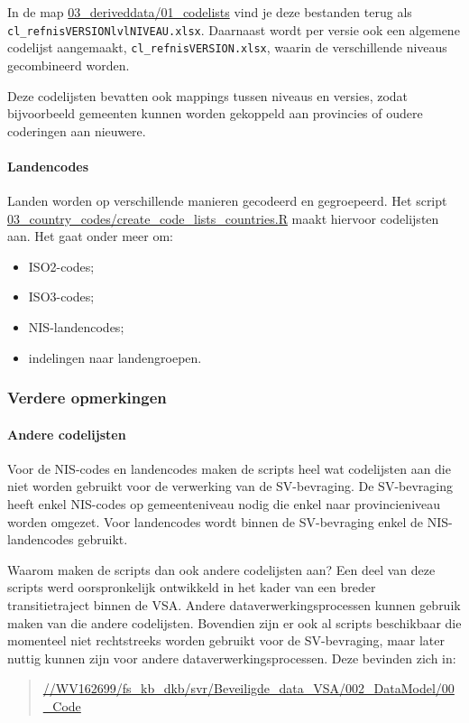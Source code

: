\documentclass{VSAnote}
\begin{document}
In de map \url{03_deriveddata/01_codelists} vind je deze bestanden terug als \verb+cl_refnisVERSIONlvlNIVEAU.xlsx+. Daarnaast wordt per versie ook een algemene codelijst aangemaakt, \verb+cl_refnisVERSION.xlsx+, waarin de verschillende niveaus gecombineerd worden.

Deze codelijsten bevatten ook mappings tussen niveaus en versies, zodat bijvoorbeeld gemeenten kunnen worden gekoppeld aan provincies of oudere coderingen aan nieuwere.

\paragraph{Landencodes}

Landen worden op verschillende manieren gecodeerd en gegroepeerd. Het script \url{03_country_codes/create_code_lists_countries.R} maakt hiervoor codelijsten aan. Het gaat onder meer om:
\begin{itemize}[nosep]
\item ISO2-codes;
\item ISO3-codes;
\item NIS-landencodes;
\item indelingen naar landengroepen.
\end{itemize}


\subsubsection{Verdere opmerkingen}

\paragraph{Andere codelijsten}

Voor de NIS-codes en landencodes maken de scripts heel wat codelijsten aan die niet worden gebruikt voor de verwerking van de SV-bevraging. De SV-bevraging heeft enkel NIS-codes op gemeenteniveau nodig die enkel naar provincieniveau worden omgezet. Voor landencodes wordt binnen de SV-bevraging enkel de NIS-landencodes gebruikt.

Waarom maken de scripts dan ook andere codelijsten aan? Een deel van deze scripts werd oorspronkelijk ontwikkeld in het kader van een breder transitietraject binnen de VSA. Andere dataverwerkingsprocessen kunnen gebruik maken van die andere codelijsten. Bovendien zijn er ook al scripts beschikbaar die momenteel niet rechtstreeks worden gebruikt voor de SV-bevraging, maar later nuttig kunnen zijn voor andere dataverwerkingsprocessen. Deze bevinden zich in:
\begin{quote}
\url{//WV162699/fs_kb_dkb/svr/Beveiligde_data_VSA/002_DataModel/00_Code}
\end{quote}
\end{document}
